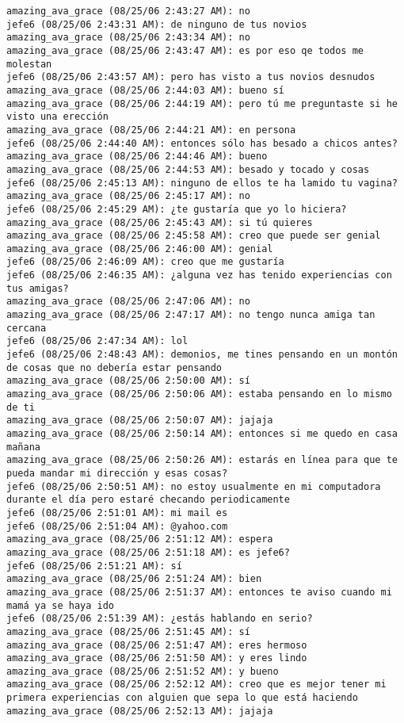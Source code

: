 \begin{verbatim}
amazing_ava_grace (08/25/06 2:43:27 AM): no
jefe6 (08/25/06 2:43:31 AM): de ninguno de tus novios
amazing_ava_grace (08/25/06 2:43:34 AM): no
amazing_ava_grace (08/25/06 2:43:47 AM): es por eso qe todos me molestan
jefe6 (08/25/06 2:43:57 AM): pero has visto a tus novios desnudos
amazing_ava_grace (08/25/06 2:44:03 AM): bueno sí
amazing_ava_grace (08/25/06 2:44:19 AM): pero tú me preguntaste si he visto una erección
amazing_ava_grace (08/25/06 2:44:21 AM): en persona
jefe6 (08/25/06 2:44:40 AM): entonces sólo has besado a chicos antes?
amazing_ava_grace (08/25/06 2:44:46 AM): bueno
amazing_ava_grace (08/25/06 2:44:53 AM): besado y tocado y cosas
jefe6 (08/25/06 2:45:13 AM): ninguno de ellos te ha lamido tu vagina?
amazing_ava_grace (08/25/06 2:45:17 AM): no
jefe6 (08/25/06 2:45:29 AM): ¿te gustaría que yo lo hiciera?
amazing_ava_grace (08/25/06 2:45:43 AM): si tú quieres
amazing_ava_grace (08/25/06 2:45:58 AM): creo que puede ser genial
amazing_ava_grace (08/25/06 2:46:00 AM): genial
jefe6 (08/25/06 2:46:09 AM): creo que me gustaría
jefe6 (08/25/06 2:46:35 AM): ¿alguna vez has tenido experiencias con tus amigas?
amazing_ava_grace (08/25/06 2:47:06 AM): no
amazing_ava_grace (08/25/06 2:47:17 AM): no tengo nunca amiga tan cercana
jefe6 (08/25/06 2:47:34 AM): lol
jefe6 (08/25/06 2:48:43 AM): demonios, me tines pensando en un montón de cosas que no debería estar pensando
amazing_ava_grace (08/25/06 2:50:00 AM): sí
amazing_ava_grace (08/25/06 2:50:06 AM): estaba pensando en lo mismo de ti
amazing_ava_grace (08/25/06 2:50:07 AM): jajaja
amazing_ava_grace (08/25/06 2:50:14 AM): entonces si me quedo en casa mañana
amazing_ava_grace (08/25/06 2:50:26 AM): estarás en línea para que te pueda mandar mi dirección y esas cosas?
jefe6 (08/25/06 2:50:51 AM): no estoy usualmente en mi computadora durante el día pero estaré checando periodicamente
jefe6 (08/25/06 2:51:01 AM): mi mail es
jefe6 (08/25/06 2:51:04 AM): @yahoo.com
amazing_ava_grace (08/25/06 2:51:12 AM): espera
amazing_ava_grace (08/25/06 2:51:18 AM): es jefe6?
jefe6 (08/25/06 2:51:21 AM): sí
amazing_ava_grace (08/25/06 2:51:24 AM): bien
amazing_ava_grace (08/25/06 2:51:37 AM): entonces te aviso cuando mi mamá ya se haya ido
jefe6 (08/25/06 2:51:39 AM): ¿estás hablando en serio?
amazing_ava_grace (08/25/06 2:51:45 AM): sí
amazing_ava_grace (08/25/06 2:51:47 AM): eres hermoso
amazing_ava_grace (08/25/06 2:51:50 AM): y eres lindo
amazing_ava_grace (08/25/06 2:51:52 AM): y bueno
amazing_ava_grace (08/25/06 2:52:12 AM): creo que es mejor tener mi primera experiencias con alguien que sepa lo que está haciendo 
amazing_ava_grace (08/25/06 2:52:13 AM): jajaja

\end{verbatim}
